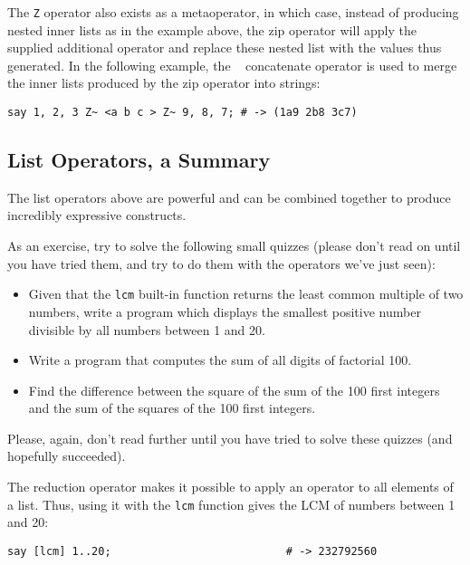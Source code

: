 The \verb'Z' operator also exists as a metaoperator, in 
which case, instead of producing nested inner lists as 
in the example above, the zip operator will apply the 
supplied additional operator and replace these nested 
list with the values thus generated. In the following 
example, the ~ concatenate operator is used to merge 
the inner lists produced by the zip operator into 
strings:


\begin{verbatim}
say 1, 2, 3 Z~ <a b c > Z~ 9, 8, 7; # -> (1a9 2b8 3c7)
\end{verbatim}

\subsection{List Operators, a Summary}

The list operators above are powerful 
and can be combined together to produce incredibly 
expressive constructs.

As an exercise, try to solve the following small 
quizzes (please don't read on until you have tried 
them, and try to do them with the operators we've 
just seen):

\begin{itemize}
\item Given that the {\tt lcm} built-in function 
returns the least common multiple of two numbers, 
write a program which displays the smallest positive 
number divisible by all numbers between 1 and 20.

\item Write a program that computes the sum of all 
digits of factorial 100.

\item Find the difference between the square of the sum 
of the 100 first integers and the sum of the squares of 
the 100 first integers.
\end{itemize}

Please, again, don't read further until you have tried 
to solve these quizzes (and hopefully succeeded).

The reduction operator makes it possible to apply an 
operator to all elements of a list. Thus, using it 
with the {\tt lcm} function gives the LCM of numbers 
between 1 and 20:

\begin{verbatim}
say [lcm] 1..20;                           # -> 232792560
\end{verbatim}

